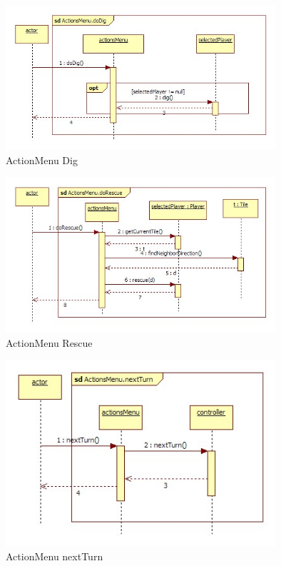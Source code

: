 \begin{figure}[H]
	\begin{center}
		\includegraphics[width=10cm]{chapters/chapter11/seq/ActionMenu_doDig.jpg}
		\caption{ActionMenu Dig}
		\label{ActionMenu Dig}
	\end{center}
\end{figure}
\begin{figure}[H]
	\begin{center}
		\includegraphics[width=10cm]{chapters/chapter11/seq/ActionMenu_doRescue.jpg}
		\caption{ActionMenu Rescue}
		\label{ActionMenu Rescue}
	\end{center}
\end{figure}
\begin{figure}[H]
	\begin{center}
		\includegraphics[width=10cm]{chapters/chapter11/seq/ActionsMenu.nextTurn.jpg}
		\caption{ActionMenu nextTurn}
		\label{ActionMenu nextTurn}
	\end{center}
\end{figure}
